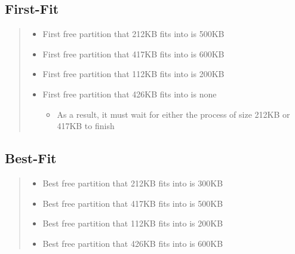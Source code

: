 \documentclass[letterpaper, 10pt,DIV=13]{scrartcl}
\numberwithin{equation}{section} %
\numberwithin{figure}{section} %
\numberwithin{table}{section} %
\begin{document}
\subsection{First-Fit}
\begin{quote}

    \begin{itemize}
      \item {First free partition that 212KB fits into is 500KB}
      \item {First free partition that 417KB fits into is 600KB}
      \item {First free partition that 112KB fits into is 200KB}
      \item {First free partition that 426KB fits into is none}
      \begin{itemize}
        \item {As a result, it must wait for either the process of size 212KB or 417KB to finish}
        \end{itemize}
    \end{itemize}

\end{quote}


\subsection{Best-Fit}
\begin{quote}
   
    \begin{itemize}
      \item {Best free partition that 212KB fits into is 300KB}
      \item {Best free partition that 417KB fits into is 500KB}
      \item {Best free partition that 112KB fits into is 200KB}
      \item {Best free partition that 426KB fits into is 600KB}
    \end{itemize}
    
\end{quote}
\end{document}
